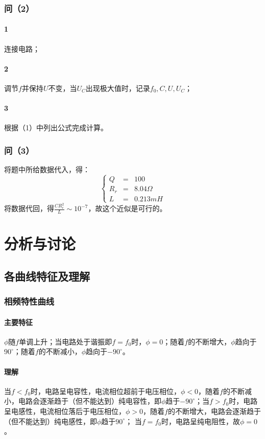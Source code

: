 \documentclass{ctexart}
\begin{document}
\subsubsection{问（2）}
\paragraph{1}连接电路；
\paragraph{2}调节$f$并保持$U$不变，当$U_C$出现极大值时，记录$f_0,C,U,U_C$；
\paragraph{3}根据（1）中列出公式完成计算。
\subsubsection{问（3）}
将题中所给数据代入，得：
$$ \left\{
  \begin{aligned}
  Q & = & 100 \\
  R_r & = & 8.04\Omega \\
  L & = & 0.213 mH
  \end{aligned}
  \right.
  $$
  将数据代回，得$\frac{CR_r^2}{L}\sim10^{-7}$，故这个近似是可行的。
  \section{分析与讨论}
  \subsection{各曲线特征及理解}
  \subsubsection{相频特性曲线}
  \paragraph{主要特征}$\phi$随$f$单调上升；当电路处于谐振即$f=f_0$时，$\phi=0$；随着$f$的不断增大，$\phi$趋向于$90^\circ$；随着$f$的不断减小，$\phi$趋向于$-90^\circ$。
  \paragraph{理解}当$f<f_0$时，电路呈电容性，电流相位超前于电压相位，$\phi<0$，随着$f$的不断减小，电路会逐渐趋于（但不能达到）纯电容性，即$\phi$趋于$-90^\circ$；当$f>f_0$时，电路呈电感性，电流相位落后于电压相位，$\phi>0$，随着$f$的不断增大，电路会逐渐趋于（但不能达到）纯电感性，即$\phi$趋于$90^\circ$；
当$f=f_0$时，电路呈纯电阻性，故$\phi=0$。
\end{document}
